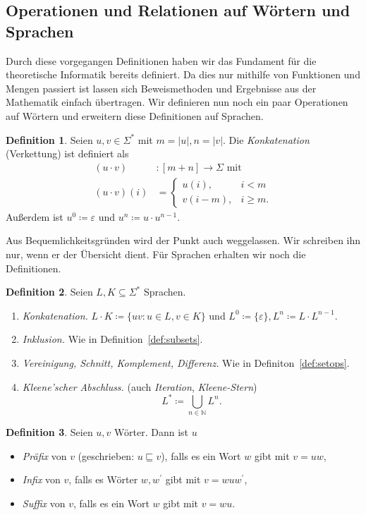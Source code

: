 \documentclass[11pt, a4paper]{article}
\theoremstyle{definition}
\newtheorem{definition}{Definition}[section]
\theoremstyle{plain}
\numberwithin{equation}{section}
\begin{document}
\subsection{Operationen und Relationen auf Wörtern und Sprachen}\label{sec:awl_wordops}
Durch diese vorgegangen Definitionen haben wir das Fundament für die theoretische Informatik bereits definiert. Da dies nur mithilfe von Funktionen und Mengen  passiert ist lassen sich Beweismethoden und Ergebnisse aus der Mathematik einfach übertragen. Wir definieren nun noch ein paar Operationen auf Wörtern und erweitern diese Definitionen auf Sprachen.
\begin{definition}
	Seien $u, v \in \Sigma^\ast$ mit $m = |u|, n = |v|$. Die \textit{Konkatenation} (Verkettung) ist definiert als
	\begin{align*}
		(u \cdot v)&\colon [m{+}n] \to \Sigma \text{ mit}\\
		(u \cdot v)(i) &= \left\lbrace \begin{array}{ll}u(i), & i < m\\ v(i-m), & i \geq m. \end{array} \right.
	\end{align*}
	Außerdem ist $u^0 \coloneqq \varepsilon$ und $u^n \coloneqq u \cdot u^{n-1}$.
\end{definition}
Aus Bequemlichkeitsgründen wird der Punkt auch weggelassen. Wir schreiben ihn nur, wenn er der Übersicht dient. Für Sprachen erhalten wir noch die Definitionen.
\begin{definition}
	Seien $L, K \subseteq \Sigma^\ast$ Sprachen.
	\begin{enumerate}
		\item \textit{Konkatenation.} $L \cdot K \coloneqq \{ uv : u \in L, v \in K \}$ und $L^0 \coloneqq \{ \varepsilon \}, L^n \coloneqq L \cdot L^{n-1}$.
		\item \textit{Inklusion.} Wie in Definition~\ref{def:subsets}.
		\item \textit{Vereinigung, Schnitt, Komplement, Differenz.} Wie in Definiton~\ref{def:setops}.
		\item \textit{Kleene'scher Abschluss.} (auch \textit{Iteration}, \textit{Kleene-Stern})
			$$
				L^\ast \coloneqq \bigcup_{n \in \mathbb{N}} L^n.
			$$
	\end{enumerate}
\end{definition}
\begin{definition}
	Seien $u, v$ Wörter. Dann ist $u$
	\begin{itemize}
		\item \textit{Präfix} von $v$ (geschrieben: $u \sqsubseteq v$), falls es ein Wort $w$ gibt mit $v = uw$,
		\item \textit{Infix} von $v$, falls es Wörter $w, w^\prime$ gibt mit $v = wuw^\prime$,
		\item \textit{Suffix} von $v$, falls es ein Wort $w$ gibt mit $v = wu$.
	\end{itemize}
\end{definition}
\end{document}
